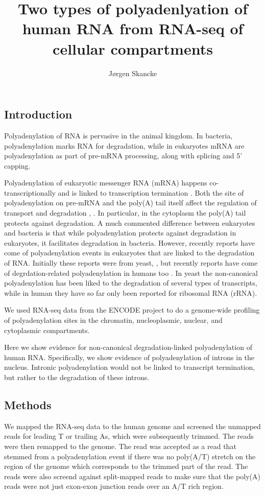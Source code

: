 \documentclass[a4paper]{article}
\title{Two types of polyadenlyation of human RNA from RNA-seq of cellular
compartments}
\author{Jørgen Skancke}
\begin{document}
 
\maketitle

\subsection{Introduction}
Polyadenylation of RNA is pervasive in the animal kingdom. In bacteria,
polyadenylation marks RNA for degradation, while in eukaryotes mRNA are
polyadenylation as part of pre-mRNA processing, along with splicing and 5'
capping. 

Polyadenylation of eukaryotic messenger RNA (mRNA) happens co-transcriptionally
and is linked to transcription termination \cite{}. Both the site of
polyadenylation on pre-mRNA and the poly(A) tail itself affect the regulation
of transport and degradation \cite{}, \cite{}. In particular, in the cytoplasm
the poly(A) tail protects against degradation. A much commented difference
between eukaryotes and bacteria is that while polyadenylation protects against
degradation in eukaryotes, it facilitates degradation in bacteria. However,
recently reports have come of polyadenylation events in eukaryotes that are
linked to the degradation of RNA. Initially these reports were from yeast,
\cite{}, but recently reports have come of degrdation-related polyadenylation
in humans too \cite{}. In yeast the non-canonical polyadenylation has been
liked to the degradation of several types of transcripts, while in human they
have so far only been reported for ribosomal RNA (rRNA).

We used RNA-seq data from the ENCODE project to do a genome-wide profiling of
polyadenylation sites in the chromatin, nucleoplasmic, nuclear, and cytoplasmic
compartments.

Here we show evidence for non-canonical degradation-linked polyadenylation of
human RNA. Specifically, we show evidence of polyadenylation of introns in
the nucleus. Intronic polyadenylation would not be linked to transcript
termination, but rather to the degradation of these introns.

\subsection{Methods}
We mapped the RNA-seq data to the human genome and screened the unmapped reads
for leading T or trailing As, which were subsequently trimmed. The reads were
then remapped to the genome. The read was accepted as a read that stemmed from
a polyadenylation event if there was no poly(A/T) stretch on the region of the
genome which corresponds to the trimmed part of the read. The reads were also
screend against split-mapped reads to make sure that the poly(A) reads were not
just exon-exon junction reads over an A/T rich region.
\end{document}
